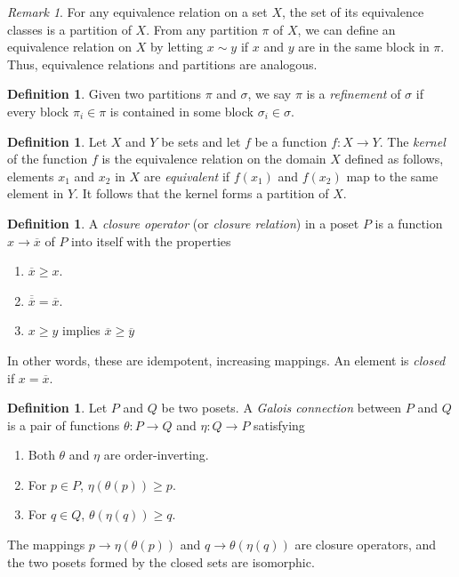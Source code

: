 \documentclass[psamsfonts]{amsart}
\theoremstyle{definition}
\newtheorem{defn}[thm]{Definition}
\theoremstyle{remark}
\newtheorem{rem}[thm]{Remark}
\numberwithin{equation}{section}
\begin{document}
\begin{rem}
For any equivalence relation on a set $X$, the set of its equivalence classes is a partition of $X$. From any partition $\pi$ of $X$, we can define an equivalence relation on $X$ by letting $x\sim y$ if $x$ and $y$ are in the same block in $\pi$. Thus, equivalence relations and partitions are analogous.
\end{rem}

\begin{defn}
Given two partitions $\pi$ and $\sigma$, we say $\pi$ is a \textit{refinement} of $\sigma$ if every block $\pi_i\in \pi$ is contained in some block $\sigma_i\in \sigma$. 
\end{defn}

\begin{defn}\label{kernel} Let $X$ and $Y$ be sets and let $f$ be a function $f:X\to Y$. The \textit{kernel} of the function $f$ is the equivalence relation on the domain $X$ defined as follows, elements $x_1$ and $x_2$ in $X$ are \textit{equivalent} if $f(x_1)$ and $f(x_2)$ map to the same element in $Y$. It follows that the kernel forms a partition of $X$. 
\end{defn}


\begin{defn}
A \textit{closure operator} (or \textit{closure relation}) in a poset $P$ is a function $x\to \overline{x}$ of $P$ into itself with the properties
\begin{enumerate}
    \item $\overline{x}\geq x$.
    \item $\overline{\overline{x}}=\overline{x}$.
    \item $x\geq y$ implies $\overline{x}\geq \overline{y}$
\end{enumerate}
In other words, these are idempotent, increasing mappings. An element is \textit{closed} if $x=\overline{x}$.
\end{defn}

\begin{defn}\label{galois connection}
Let $P$ and $Q$ be two posets. A \textit{Galois connection} between $P$ and $Q$ is a pair of functions $\theta:P\to Q$ and $\eta: Q\to P$ satisfying 
\begin{enumerate}
    \item Both $\theta$ and $\eta$ are order-inverting.
    \item For $p\in P$, $\eta(\theta(p))\geq p$.
    \item For $q\in Q$, $\theta(\eta(q))\geq q$.
\end{enumerate}
The mappings $p\to \eta(\theta(p))$ and $q\to \theta(\eta(q))$ are closure operators, and the two posets formed by the closed sets are isomorphic. 
\end{defn}
\end{document}
